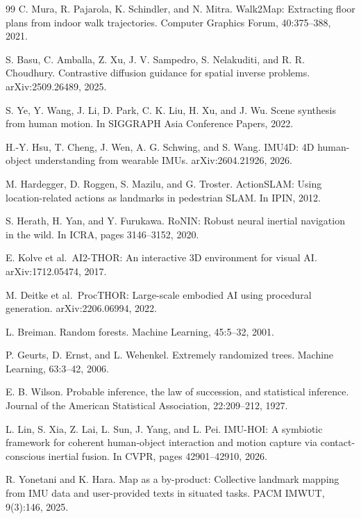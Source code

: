 \documentclass[10pt,twocolumn,letterpaper]{article}
\begin{document}
{\small
\begin{thebibliography}{99}
 C. Mura, R. Pajarola, K. Schindler, and N. Mitra. Walk2Map: Extracting
floor plans from indoor walk trajectories. Computer Graphics Forum,
40:375--388, 2021.

 S. Basu, C. Amballa, Z. Xu, J. V. Sampedro, S. Nelakuditi, and R. R.
Choudhury. Contrastive diffusion guidance for spatial inverse problems.
arXiv:2509.26489, 2025.

 S. Ye, Y. Wang, J. Li, D. Park, C. K. Liu, H. Xu, and J. Wu. Scene
synthesis from human motion. In SIGGRAPH Asia Conference Papers, 2022.

 H.-Y. Hsu, T. Cheng, J. Wen, A. G. Schwing, and S. Wang. IMU4D: 4D
human-object understanding from wearable IMUs. arXiv:2604.21926, 2026.

 M. Hardegger, D. Roggen, S. Mazilu, and G. Troster. ActionSLAM: Using
location-related actions as landmarks in pedestrian SLAM. In IPIN, 2012.

 S. Herath, H. Yan, and Y. Furukawa. RoNIN: Robust neural inertial
navigation in the wild. In ICRA, pages 3146--3152, 2020.

 E. Kolve et al.~AI2-THOR: An interactive 3D environment for visual AI.
arXiv:1712.05474, 2017.

 M. Deitke et al.~ProcTHOR: Large-scale embodied AI using procedural
generation. arXiv:2206.06994, 2022.

 L. Breiman. Random forests. Machine Learning, 45:5--32, 2001.

 P. Geurts, D. Ernst, and L. Wehenkel. Extremely randomized trees.
Machine Learning, 63:3--42, 2006.

 E. B. Wilson. Probable inference, the law of succession, and statistical
inference. Journal of the American Statistical Association, 22:209--212,
1927.

 L. Lin, S. Xia, Z. Lai, L. Sun, J. Yang, and L. Pei. IMU-HOI: A
symbiotic framework for coherent human-object interaction and motion
capture via contact-conscious inertial fusion. In CVPR, pages
42901--42910, 2026.

 R. Yonetani and K. Hara. Map as a by-product: Collective landmark
mapping from IMU data and user-provided texts in situated tasks. PACM
IMWUT, 9(3):146, 2025.
\end{thebibliography}
}
\end{document}
